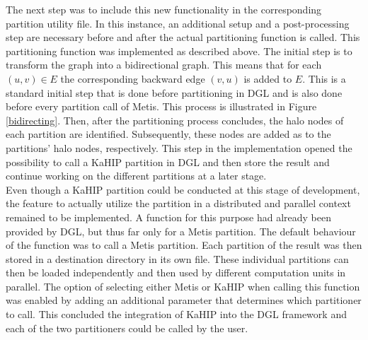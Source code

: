 \documentclass[acmsmall,nonacm,screen,review]{acmart}
\begin{document}
The next step was to include this new functionality in the corresponding partition utility file. In this instance, an additional setup and a post-processing step are necessary before and after the actual partitioning function is called. This partitioning function was implemented as described above. The initial step is to transform the graph into a bidirectional graph. This means that for each $(u,v) \in E$ the corresponding backward edge $(v,u)$ is added to $E$. This is a standard initial step that is done before partitioning in DGL and is also done before every partition call of Metis. This process is illustrated in Figure \ref{bidirecting}. Then, after the partitioning process concludes, the halo nodes of each partition are identified. Subsequently, these nodes are added as to the partitions' halo nodes, respectively. This step in the implementation opened the possibility to call a KaHIP partition in DGL and then store the result and continue working on the different partitions at a later stage. \\
Even though a KaHIP partition could be conducted at this stage of development, the feature to actually utilize the partition in a distributed and parallel context remained to be implemented. A function for this purpose had already been provided by DGL, but thus far only for a Metis partition. The default behaviour of the function was to call a Metis partition. Each partition of the result was then stored in a destination directory in its own file. These individual partitions can then be loaded independently and then used by different computation units in parallel. The option of selecting either Metis or KaHIP when calling this function was enabled by adding an additional parameter that determines which partitioner to call. This concluded the integration of KaHIP into the DGL framework and each of the two partitioners could be called by the user.
\end{document}
